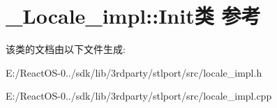 \hypertarget{class___locale__impl_1_1_init}{}\section{\+\_\+\+Locale\+\_\+impl\+:\+:Init类 参考}
\label{class___locale__impl_1_1_init}


该类的文档由以下文件生成\+:\begin{DoxyCompactItemize}
\item 
E\+:/\+React\+O\+S-\/0../sdk/lib/3rdparty/stlport/src/locale\+\_\+impl.\+h\item 
E\+:/\+React\+O\+S-\/0../sdk/lib/3rdparty/stlport/src/locale\+\_\+impl.\+cpp\end{DoxyCompactItemize}
